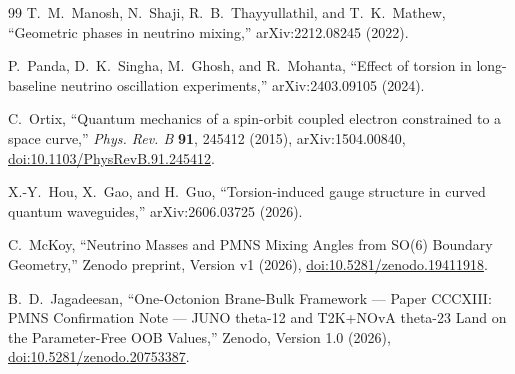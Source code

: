 \documentclass[10pt,twocolumn]{article}
\begin{document}
\begin{thebibliography}{99}
T.~M.~Manosh, N.~Shaji, R.~B.~Thayyullathil, and T.~K.~Mathew,
``Geometric phases in neutrino mixing,''
arXiv:2212.08245 (2022).

P.~Panda, D.~K.~Singha, M.~Ghosh, and R.~Mohanta,
``Effect of torsion in long-baseline neutrino oscillation experiments,''
arXiv:2403.09105 (2024).

C.~Ortix,
``Quantum mechanics of a spin-orbit coupled electron constrained to a space curve,''
\emph{Phys. Rev. B} \textbf{91}, 245412 (2015),
arXiv:1504.00840,
\href{https://doi.org/10.1103/PhysRevB.91.245412}
{doi:10.1103/PhysRevB.91.245412}.

X.-Y.~Hou, X.~Gao, and H.~Guo,
``Torsion-induced gauge structure in curved quantum waveguides,''
arXiv:2606.03725 (2026).

C.~McKoy,
``Neutrino Masses and PMNS Mixing Angles from SO(6) Boundary Geometry,''
Zenodo preprint, Version v1 (2026),
\href{https://doi.org/10.5281/zenodo.19411918}
{doi:10.5281/zenodo.19411918}.

B.~D.~Jagadeesan,
``One-Octonion Brane-Bulk Framework --- Paper CCCXIII: PMNS Confirmation Note ---
JUNO theta-12 and T2K+NOvA theta-23 Land on the Parameter-Free OOB Values,''
Zenodo, Version 1.0 (2026),
\href{https://doi.org/10.5281/zenodo.20753387}
{doi:10.5281/zenodo.20753387}.

\end{thebibliography}
\end{document}
